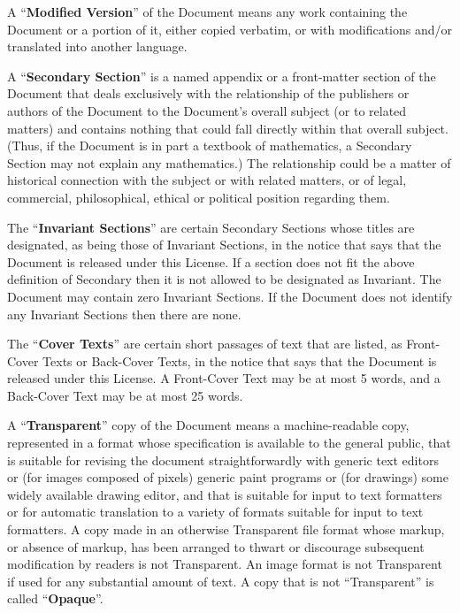 \documentclass[10pt,a4paper,ngerman,titlepage,tocindentauto]{article}
\begin{document}
\begin{multicols}{3}
{				A ``\textbf{Modified Version}'' of the Document means any work containing the
				Document or a portion of it, either copied verbatim, or with
				modifications and/or translated into another language.

				A ``\textbf{Secondary Section}'' is a named appendix or a front-matter section of
				the Document that deals exclusively with the relationship of the
				publishers or authors of the Document to the Document's overall subject
				(or to related matters) and contains nothing that could fall directly
				within that overall subject.  (Thus, if the Document is in part a
				textbook of mathematics, a Secondary Section may not explain any
				mathematics.)  The relationship could be a matter of historical
				connection with the subject or with related matters, or of legal,
				commercial, philosophical, ethical or political position regarding
				them.

				The ``\textbf{Invariant Sections}'' are certain Secondary Sections whose titles
				are designated, as being those of Invariant Sections, in the notice
				that says that the Document is released under this License.  If a
				section does not fit the above definition of Secondary then it is not
				allowed to be designated as Invariant.  The Document may contain zero
				Invariant Sections.  If the Document does not identify any Invariant
				Sections then there are none.

				The ``\textbf{Cover Texts}'' are certain short passages of text that are listed,
				as Front-Cover Texts or Back-Cover Texts, in the notice that says that
				the Document is released under this License.  A Front-Cover Text may
				be at most 5 words, and a Back-Cover Text may be at most 25 words.

				A ``\textbf{Transparent}'' copy of the Document means a machine-readable copy,
				represented in a format whose specification is available to the
				general public, that is suitable for revising the document
				straightforwardly with generic text editors or (for images composed of
				pixels) generic paint programs or (for drawings) some widely available
				drawing editor, and that is suitable for input to text formatters or
				for automatic translation to a variety of formats suitable for input
				to text formatters.  A copy made in an otherwise Transparent file
				format whose markup, or absence of markup, has been arranged to thwart
				or discourage subsequent modification by readers is not Transparent.
				An image format is not Transparent if used for any substantial amount
				of text.  A copy that is not ``Transparent'' is called ``\textbf{Opaque}''.

}
\end{multicols}
\end{document}
